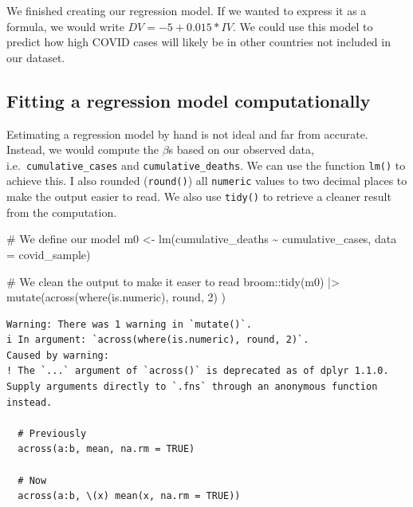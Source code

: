 \documentclass[
  letterpaper,
]{krantz}
\makeatletter
\newenvironment{Shaded}{\begin{snugshade}}{\end{snugshade}}
\newcommand{\AttributeTok}[1]{\textcolor[rgb]{0.40,0.45,0.13}{#1}}
\newcommand{\CommentTok}[1]{\textcolor[rgb]{0.37,0.37,0.37}{#1}}
\newcommand{\DecValTok}[1]{\textcolor[rgb]{0.68,0.00,0.00}{#1}}
\newcommand{\FunctionTok}[1]{\textcolor[rgb]{0.28,0.35,0.67}{#1}}
\newcommand{\NormalTok}[1]{\textcolor[rgb]{0.00,0.23,0.31}{#1}}
\newcommand{\OtherTok}[1]{\textcolor[rgb]{0.00,0.23,0.31}{#1}}
\newcommand{\SpecialCharTok}[1]{\textcolor[rgb]{0.37,0.37,0.37}{#1}}
\newenvironment{kframe}{%
\medskip{}
\setlength{\fboxsep}{.8em}
 \def\at@end@of@kframe{}%
 \ifinner\ifhmode%
  \def\at@end@of@kframe{\end{minipage}}%
  \begin{minipage}{\columnwidth}%
 \fi\fi%
 \def\FrameCommand##1{\hskip\@totalleftmargin \hskip-\fboxsep
 \colorbox{shadecolor}{##1}\hskip-\fboxsep
     \hskip-\linewidth \hskip-\@totalleftmargin \hskip\columnwidth}%
 \MakeFramed {\advance\hsize-\width
   \@totalleftmargin\z@ \linewidth\hsize
   \@setminipage}}%
 {\par\unskip\endMakeFramed%
 \at@end@of@kframe}
\renewenvironment{Shaded}{\begin{kframe}}{\end{kframe}}
\makeatother
\begin{document}
We finished creating our regression model. If we wanted to express it as
a formula, we would write \(DV = -5 + 0.015 * IV\). We could use this
model to predict how high COVID cases will likely be in other countries
not included in our dataset.

\subsection{Fitting a regression model
computationally}\label{sec-fitting-a-regression-model-computationally}

Estimating a regression model by hand is not ideal and far from
accurate. Instead, we would compute the \(\beta\)s based on our observed
data, i.e.~\texttt{cumulative\_cases} and \texttt{cumulative\_deaths}.
We can use the function \texttt{lm()} to achieve this. I also rounded
(\texttt{round()}) all \texttt{numeric} values to two decimal places to
make the output easier to read. We also use \texttt{tidy()} to retrieve
a cleaner result from the computation.

\begin{Shaded}
\begin{Highlighting}[]
\CommentTok{\# We define our model}
\NormalTok{m0 }\OtherTok{\textless{}{-}} \FunctionTok{lm}\NormalTok{(cumulative\_deaths }\SpecialCharTok{\textasciitilde{}}\NormalTok{ cumulative\_cases, }\AttributeTok{data =}\NormalTok{ covid\_sample)}

\CommentTok{\# We clean the output to make it easer to read}
\NormalTok{broom}\SpecialCharTok{::}\FunctionTok{tidy}\NormalTok{(m0) }\SpecialCharTok{|\textgreater{}}
  \FunctionTok{mutate}\NormalTok{(}\FunctionTok{across}\NormalTok{(}\FunctionTok{where}\NormalTok{(is.numeric),}
\NormalTok{                round, }\DecValTok{2}\NormalTok{)}
\NormalTok{         )}
\end{Highlighting}
\end{Shaded}

\begin{verbatim}
Warning: There was 1 warning in `mutate()`.
i In argument: `across(where(is.numeric), round, 2)`.
Caused by warning:
! The `...` argument of `across()` is deprecated as of dplyr 1.1.0.
Supply arguments directly to `.fns` through an anonymous function instead.

  # Previously
  across(a:b, mean, na.rm = TRUE)

  # Now
  across(a:b, \(x) mean(x, na.rm = TRUE))
\end{verbatim}
\end{document}
